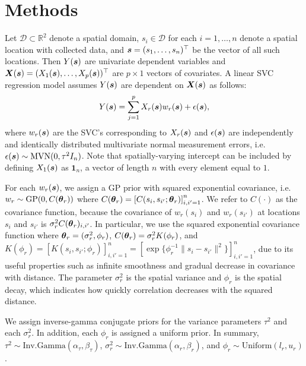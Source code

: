 \section{Methods}
\label{sec:methods}
Let $\mathcal{D} \subset \mathbb{R}^2$ denote a spatial domain, $s_i \in \mathcal{D}$ for each $i = 1, \dots, n$ denote a spatial location with collected data, and $\boldsymbol{s} = (s_1, \dots, s_n)^\top$ be the vector of all such locations. Then $Y(\boldsymbol{s})$ are univariate dependent variables and $\boldsymbol{X}(\boldsymbol{s}) = (X_1(\boldsymbol{s}), \dots, X_p(\boldsymbol{s}))^\top$ are $p \times 1$ vectors of covariates. A linear SVC regression model assumes $Y(\boldsymbol{s})$ are dependent on $\boldsymbol{X}(\boldsymbol{s})$ as follows:
\begin{align*}
    Y(\boldsymbol{s}) = \sum_{j=1}^p X_r(\boldsymbol{s})w_r(\boldsymbol{s}) + \epsilon(\boldsymbol{s}),
\end{align*}
where $w_r(\boldsymbol{s})$ are the SVC's corresponding to $X_r(\boldsymbol{s})$ and $\epsilon(\boldsymbol{s})$ are independently and identically distributed multivariate normal measurement errors, i.e. $\epsilon(\boldsymbol{s}) \sim \text{MVN}(0, \tau^2 I_n)$. Note that spatially-varying intercept can be included by defining $X_1(\boldsymbol{s})$ as $\mathbf{1}_n$, a vector of length $n$ with every element equal to $1$.

For each $w_r(\boldsymbol{s})$, we assign a GP prior with squared exponential covariance, i.e. $w_r \sim \text{GP}(0, C(\boldsymbol{\theta}_r))$ where $C(\boldsymbol{\theta}_r) = \left[C(s_i, s_{i'}; \boldsymbol{\theta}_r)\right]_{i, i' = 1}^n$. We refer to $C(\cdot)$ as the covariance function, because the covariance of $w_r(s_i)$ and $w_r(s_{i'})$ at locations $s_i$ and $s_{i'}$ is $\sigma_r^2 C(\boldsymbol{\theta}_r)_{i, i'}$. In particular, we use the squared exponential covariance function where $\boldsymbol{\theta}_r = (\sigma_r^2, \phi_r)$, $C(\boldsymbol{\theta}_r) = \sigma_r^2 K(\phi_r)$, and $K(\phi_r) = \left[ K(s_i, s_{i'}; \phi_r) \right]_{i, i' = 1}^n = \left[\exp\{\phi_r^{-1}\|s_i-s_{i'}\|^2\}\right]_{i, i' = 1}^n$,
due to its useful properties such as infinite smoothness and gradual decrease in covariance with distance. The parameter $\sigma_r^2$ is the spatial variance and $\phi_r$ is the spatial decay, which indicates how quickly correlation decreases with the squared distance.

We assign inverse-gamma conjugate priors for the variance parameters $\tau^2$ and each $\sigma_r^2$. In addition, each $\phi_r$ is assigned a uniform prior. In summary, $\tau^2 \sim \text{Inv.Gamma}(\alpha_\tau, \beta_\tau)$, $\sigma_r^2 \sim \text{Inv.Gamma}(\alpha_r, \beta_r)$, and $\phi_r \sim \text{Uniform}(l_r, u_r)$.


